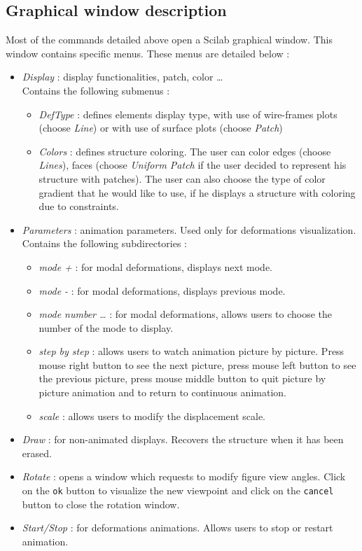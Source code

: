 \subsection{Graphical window description}
Most of the commands detailed above open a Scilab graphical window. This window contains specific menus. These menus are detailed below :
\begin{itemize}
\item \emph{Display} : display functionalities, patch, color \ldots \\Contains the following submenus :
\begin{itemize}
\item \emph{DefType} : defines elements display type, with use of wire-frames plots (choose \emph{Line}) or with use of surface plots (choose \emph{Patch})
\item \emph{Colors} : defines structure coloring. The user can color edges (choose \emph{Lines}), faces (choose \emph{Uniform Patch} if the user decided to represent his structure with patches). The user can also choose the type of color gradient that he would like to use, if he displays a structure with coloring due to constraints.
\end{itemize}
\item \emph{Parameters} : animation parameters. Used only for deformations visualization. Contains the following subdirectories :
\begin{itemize}
\item \emph{mode +} : for modal deformations, displays next mode.
\item \emph{mode -} : for modal deformations, displays previous mode.
\item \emph{mode number \ldots} : for modal deformations, allows users to choose the number of the mode to display.
\item \emph{step by step} : allows users to watch animation picture by picture. Press mouse right button to see the next picture, press mouse left button to see the previous picture, press mouse middle button to quit picture by picture animation and to return to continuous animation.
\item \emph{scale} : allows users to modify the displacement scale.
\end{itemize}
\item \emph{Draw} : for non-animated displays. Recovers the structure when it has been erased.
\item \emph{Rotate} : opens a window which requests to modify figure view angles. Click on the \verb+ok+ button to visualize the new viewpoint and click on the \verb+cancel+ button to close the rotation window.
\item \emph{Start/Stop} : for deformations animations. Allows users to stop or restart animation.
\end{itemize}

